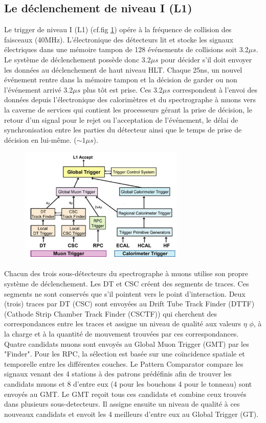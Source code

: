 \subsection{Le déclenchement de niveau I (L1)}
Le trigger de niveau I (L1) (cf.fig \ref{L1}) opére à la fréquence de collision des faisceaux (40MHz). L'électronique des détecteurs lit et stocke les  signaux électriques dans une mémoire tampon de 128 événements de collisions soit 3.2$\mu s$. Le système de déclenchement possède donc 3.2$\mu s$ pour  décider s'il doit envoyer les données au déclenchement de haut niveau HLT. Chaque 25ns, un nouvel événement rentre dans la mémoire tampon et la décision de garder ou non l'événement arrivé 3.2$\mu s$ plus tôt est prise. Ces 3.2$\mu s$ correspondent à l'envoi des données depuis l'électronique des calorimètres et du spectrographe à muons vers la caverne de services qui contient les processeurs gérant la prise de décision, le retour d'un signal pour le rejet ou l'acceptation de l'événement, le délai de synchronisation entre les parties du détecteur ainsi que le temps de prise de décision en lui-même. ($\sim1\mu s$). 

	  \begin{figure}[ht!]
	\centering
	\includegraphics[width=0.70\textwidth]{CMS/L1.png}
	\label{L1}
\end{figure}

Chacun des trois sous-détecteurs du spectrographe à muons utilise son propre système de déclenchement. Les DT et CSC créent des segments de traces. Ces segments ne sont conservés que s'il pointent vers le point d'interaction. Deux (trois) traces par DT (CSC) sont envoyées au Drift Tube Track Finder (DTTF) (Cathode Strip Chamber Track Finder (CSCTF)) qui cherchent des correspondances entre les traces et assigne un niveau de qualité  aux valeurs $\eta$ $\phi$, à la charge et à la quantité de mouvement trouvées par ces correspondances. Quatre candidats muons sont envoyés au Global Muon Trigger (GMT) par les "Finder". Pour les RPC, la sélection est basée sur une coïncidence spatiale et temporelle entre les différentes couches. Le Pattern Comparator compare les signaux venant des 4 stations à des patrons prédéfinis afin de trouver les candidats muons et 8 d'entre eux (4 pour les bouchons 4 pour le tonneau) sont envoyés au GMT. Le GMT reçoit tous ces candidats et combine ceux trouvés dans plusieurs sous-detecteurs. Il assigne ensuite un niveau de qualité à ces nouveaux candidats et envoit les 4 meilleurs d'entre eux au Global Trigger (GT).

